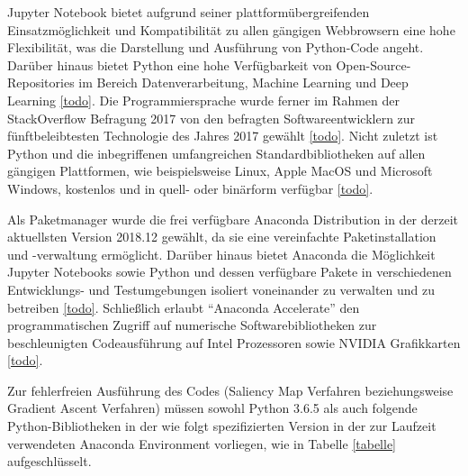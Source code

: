 Jupyter Notebook bietet aufgrund seiner plattformübergreifenden Einsatzmöglichkeit und Kompatibilität zu allen gängigen Webbrowsern eine hohe Flexibilität, was die Darstellung und Ausführung von Python-Code angeht. Darüber hinaus bietet Python eine hohe Verfügbarkeit von Open-Source-Repositories im Bereich Datenverarbeitung, Machine Learning und Deep Learning \ref{todo}. Die Programmiersprache wurde ferner im Rahmen der StackOverflow Befragung 2017 von den befragten Softwareentwicklern zur fünftbeleibtesten Technologie des Jahres 2017 gewählt \ref{todo}. Nicht zuletzt ist Python und die inbegriffenen umfangreichen Standardbibliotheken auf allen gängigen Plattformen, wie beispielsweise Linux, Apple MacOS und Microsoft Windows, kostenlos und in quell- oder binärform verfügbar \ref{todo}.


Als Paketmanager wurde die frei verfügbare Anaconda Distribution in der derzeit aktuellsten Version 2018.12 gewählt, da sie eine vereinfachte Paketinstallation und -verwaltung ermöglicht. Darüber hinaus bietet Anaconda die Möglichkeit Jupyter Notebooks sowie Python und dessen verfügbare Pakete in verschiedenen Entwicklungs- und Testumgebungen isoliert voneinander zu verwalten und zu betreiben \ref{todo}. Schließlich erlaubt “Anaconda Accelerate” den programmatischen Zugriff auf numerische Softwarebibliotheken zur beschleunigten Codeausführung auf Intel Prozessoren sowie NVIDIA Grafikkarten \ref{todo}.


Zur fehlerfreien Ausführung des Codes (Saliency Map Verfahren beziehungsweise Gradient Ascent Verfahren) müssen sowohl Python 3.6.5 als auch folgende Python-Bibliotheken in der wie folgt spezifizierten Version in der zur Laufzeit verwendeten Anaconda Environment vorliegen, wie in Tabelle \ref{tabelle} aufgeschlüsselt.


